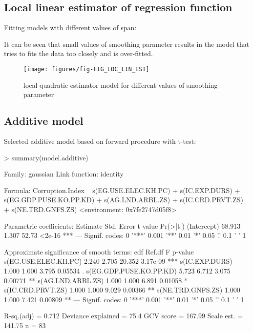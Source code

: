 \documentclass[a4paper]{article}
\begin{document}
\subsection{Local linear estimator of regression function}

Fitting models with different values of span:

It can be seen that small values of smoothing parameter results in the model
that tries to fits the data too closely and is over-fitted. 
\begin{figure}[H]
\begin{center}
\texttt{[image: figures/fig-FIG\_LOC\_LIN\_EST]}
\caption{local quadratic estimator model for different values of smoothing parameter}
\end{center}
\end{figure}

\subsection{Additive model}

Selected additive model based on forward procedure with t-test: 
\begin{Schunk}
\begin{Sinput}
> summary(model.additive)
\end{Sinput}
\begin{Soutput}
Family: gaussian 
Link function: identity 

Formula:
Corruption.Index ~ s(EG.USE.ELEC.KH.PC) + s(IC.EXP.DURS) + s(EG.GDP.PUSE.KO.PP.KD) + 
    s(AG.LND.ARBL.ZS) + s(IC.CRD.PRVT.ZS) + s(NE.TRD.GNFS.ZS)
<environment: 0x7fe2747d05f8>

Parametric coefficients:
            Estimate Std. Error t value Pr(>|t|)    
(Intercept)   68.913      1.307   52.73   <2e-16 ***
---
Signif. codes:  0 '***' 0.001 '**' 0.01 '*' 0.05 '.' 0.1 ' ' 1

Approximate significance of smooth terms:
                          edf Ref.df      F  p-value    
s(EG.USE.ELEC.KH.PC)    2.240  2.705 20.352 3.17e-09 ***
s(IC.EXP.DURS)          1.000  1.000  3.795  0.05534 .  
s(EG.GDP.PUSE.KO.PP.KD) 5.723  6.712  3.075  0.00771 ** 
s(AG.LND.ARBL.ZS)       1.000  1.000  6.891  0.01058 *  
s(IC.CRD.PRVT.ZS)       1.000  1.000  9.029  0.00366 ** 
s(NE.TRD.GNFS.ZS)       1.000  1.000  7.421  0.00809 ** 
---
Signif. codes:  0 '***' 0.001 '**' 0.01 '*' 0.05 '.' 0.1 ' ' 1

R-sq.(adj) =  0.712   Deviance explained = 75.4%
GCV score = 167.99  Scale est. = 141.75    n = 83
\end{Soutput}
\end{Schunk}
\end{document}
